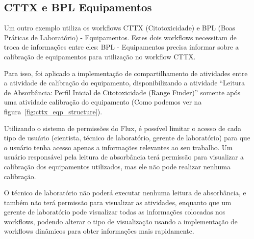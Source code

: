 \subsection{CTTX e BPL Equipamentos} \label{sec:cttx_bpl}

Um outro exemplo utiliza os workflows CTTX (Citotoxicidade) e BPL (Boas Práticas de Laboratório) - Equipamentos. Estes dois workflows necessitam de troca de informações entre eles: BPL - Equipamentos precisa informar sobre a calibração de equipamentos para utilização no workflow CTTX.

Para isso, foi aplicado a implementação de compartilhamento de atividades entre a atividade de calibração do equipamento, disponibilizando a atividade ``Leitura de Absorbância: Perfil Inicial de Citotoxicidade (Range Finder)'' somente após uma atividade calibração do equipamento (Como podemos ver na figura~\ref{fig:cttx_eqp_structure}).

Utilizando o sistema de permissões do Flux, é possível limitar o acesso de cada tipo de usuário (cientista, técnico de laboratório, gerente de laboratório) para que o usuário tenha acesso apenas a informações relevantes ao seu trabalho. Um usuário responsável pela leitura de absorbância terá permissão para visualizar a calibração dos equipamentos utilizados, mas ele não pode realizar nenhuma calibração.

O técnico de laboratório não poderá executar nenhuma leitura de absorbância, e também não terá permissão para visualizar as atividades, enquanto que um gerente de laboratório pode visualizar todas as informações colocadas nos workflows, podendo alterar o tipo de visualização usando a implementação de workflows dinâmicos para obter informações mais rapidamente.

